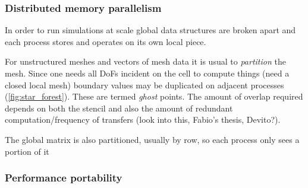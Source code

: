 \documentclass[thesis]{subfiles}
\begin{document}
\subsubsection{Distributed memory parallelism}
\label{sec:intro_mpi}


In order to run simulations at scale global data structures are broken apart and each process stores and operates on its own local piece.


For unstructured meshes and vectors of mesh data it is usual to \textit{partition} the mesh.
Since one needs all DoFs incident on the cell to compute things (need a closed local mesh) boundary values may be duplicated on adjacent processes (\cref{fig:star_forest}).
These are termed \textit{ghost} points.
The amount of overlap required depends on both the stencil and also the amount of redundant computation/frequency of transfers (look into this, Fabio's thesis, Devito?).

The global matrix is also partitioned, usually by row, so each process only sees a portion of it


\subsubsection{Performance portability}



\end{document}
